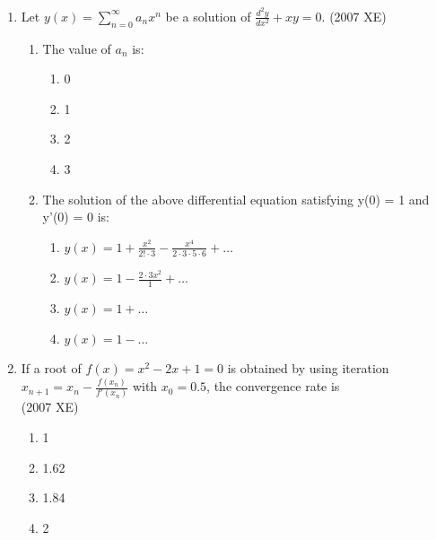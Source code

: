 \begin{enumerate}[label=\thesubsection.\arabic*,ref=\thesubsection.\theenumi]
\begin{enumerate}
    \item The sum of the absolute values of the Fourier coefficients of f is:
    \hfill{(2007 XE)}
    \begin{multicols}{4}
    \begin{enumerate}
        \item $\frac{\pi^2}{6}$
        \item $\frac{\pi^2}{3}$
        \item $\frac{2\pi^2}{3}$
        \item $\pi^2$
    \end{enumerate}
    \end{multicols}
\end{enumerate}
    \item Let $y(x) = \sum_{n=0}^{\infty} a_n x^n$ be a solution of $ \frac{d^2 y}{dx^2} + x y = 0$.
    \hfill{(2007 XE)}
    \begin{enumerate}
    \item The value of $a_n$ is:
    \begin{multicols}{4}
    \begin{enumerate}
        \item 0
        \item 1
        \item 2
        \item 3
    \end{enumerate}
\end{multicols}
    \item The solution of the above differential equation satisfying y(0) = 1 and y'(0) = 0 is:
    \begin{multicols}{2}
    \begin{enumerate}
        \item $y(x) = 1 + \frac{x^2}{2! \cdot 3} - \frac{x^4}{2 \cdot 3 \cdot 5 \cdot 6} + \dots$
        \item  $y(x) = 1 - \frac{2 \cdot 3 x^2}{1} + \dots$
        \item $y(x) = 1 + \dots$
        \item $y(x) = 1 - \dots$
    \end{enumerate}
\end{multicols}
\end{enumerate}

    \item If a root of $f(x) = x^2 - 2x + 1 = 0$ is obtained by using iteration $x_{n+1} = x_n - \frac{f(x_n)}{f'(x_n)}$ with $x_0 = 0.5$, the convergence rate is\\
   \hfill{(2007 XE)}
   \begin{multicols}{4}
    \begin{enumerate}
        \item 1
        \item 1.62
        \item 1.84
        \item 2
    \end{enumerate}
\end{multicols}


\end{enumerate}

